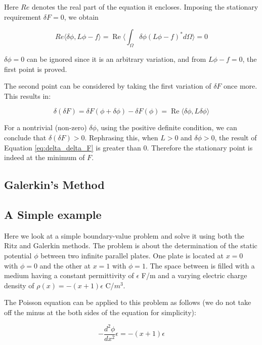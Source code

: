 \documentclass[a4paper,12pt]{report}
\renewcommand{\Re}{\operatorname{Re}}
\begin{document}
Here $Re$ denotes the real part of the equation it encloses. 
Imposing the stationary requirement $\delta F = 0$,
we obtain

\begin{equation}
  Re\langle \delta\phi, L\phi-f\rangle = \Re \langle \int_{\Omega} \delta\phi (L\phi - f)^{*} d\Omega \rangle = 0
\end{equation}

$\delta\phi = 0$ can be ignored since it is an arbitrary variation,
and from $L\phi - f = 0$, the first point is proved.

The second point can be considered by taking the first variation of $\delta F$
once more.
This results in:

\begin{equation} \label{eq:delta_delta_F}
  \delta(\delta F) = \delta F(\phi + \delta \phi) - \delta F(\phi) = \Re\langle \delta\phi, L\delta\phi \rangle
\end{equation}

For a nontrivial (non-zero) $\delta\phi$,
using the positive definite condition,
we can conclude that $\delta(\delta F) > 0$.
Rephrasing this, when $L > 0$ and $\delta \phi > 0$, 
the result of Equation \ref{eq:delta_delta_F} is greater than 0.
Therefore the stationary point is indeed at the minimum of $F$.

\subsection{Galerkin's Method}

\subsection{A Simple example}

Here we look at a simple boundary-value problem and solve it using
both the Ritz and Galerkin methods.
The problem is about the determination of the static potential $\phi$
between two infinite parallel plates.
One plate is located at $x=0$ with $\phi=0$ and
the other at $x=1$ with $\phi=1$.
The space between is filled with a medium having a constant permittivity
of $\epsilon$ F/m and a varying electric charge density of
$\rho(x)=-(x+1)\epsilon$ C/$m^3$.

The Poisson equation can be applied to this problem as follows
(we do not take off the minus at the both sides of the equation
for simplicity):

\begin{equation} \label{eq:simple_boundary_value_problem}
  -\frac{d^2\phi}{dx^2}\epsilon = -(x + 1)\epsilon
\end{equation}
\end{document}
